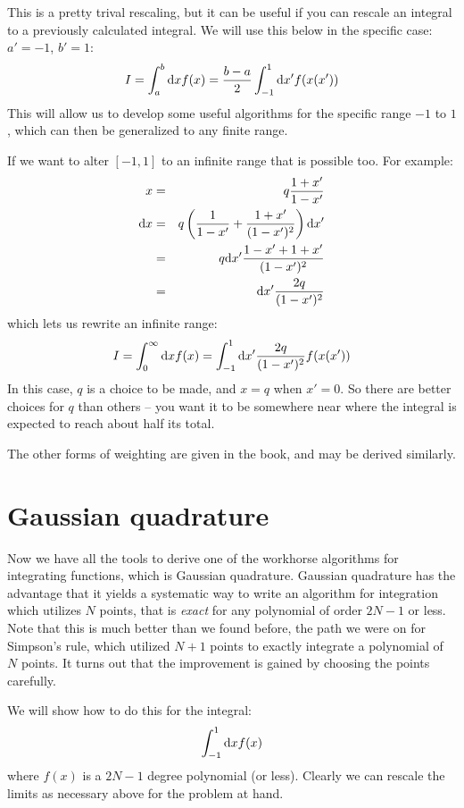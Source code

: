 This is a pretty trival rescaling, but it can be useful if you can
rescale an integral to a previously calculated integral. We will use
this below in the specific case: $a'=-1$, $b'=1$:
\begin{equation}
 I = \int_a^b {\rm d}x f(x) = \frac{b-a}{2} \int_{-1}^{1} {\rm d}x' f(x(x'))
\end{equation}
This will allow us to develop some useful algorithms for the specific
range $-1$ to $1$, which can then be generalized to any finite range.

If we want to alter $[-1, 1]$ to an infinite range that is possible
too.  For example:
\begin{eqnarray}
x &=& q \frac{1+x'}{1-x'}  \cr
{\rm d}x &=& q \left(\frac{1}{1-x'} + \frac{1+x'}{(1-x')^2}\right){\rm
d}x'\cr
&=& q {\rm d}x' \frac{1 -x' + 1 + x'}{(1-x')^2}  \cr
&=& {\rm d}x' \frac{2q}{(1-x')^2}  \cr
\end{eqnarray}
which lets us rewrite an infinite range:
\begin{equation}
 I = \int_0^\infty {\rm d}x f(x) = \int_{-1}^{1} {\rm d}x'
 \frac{2q}{(1-x')^2} f(x(x'))
\end{equation}
In this case, $q$ is a choice to be made, and $x=q$ when $x'=0$. So
there are better choices for $q$ than others -- you want it to be
somewhere near where the integral is expected to reach about half its
total.

The other forms of weighting are given in the book, and may be derived
similarly. 

\section{Gaussian quadrature}

Now we have all the tools to derive one of the workhorse algorithms
for integrating functions, which is Gaussian quadrature. Gaussian
quadrature has the advantage that it yields a systematic way to write
an algorithm for integration which utilizes $N$ points, that is {\it
  exact} for any polynomial of order $2N-1$ or less. Note that this is
much better than we found before, the path we were on for Simpson's
rule, which utilized $N+1$ points to exactly integrate a polynomial of
$N$ points. It turns out that the improvement is gained by choosing
the points carefully.

We will show how to do this for the integral:
\begin{equation}
\int_{-1}^{1} {\rm d}x f(x)
\end{equation}
where $f(x)$ is a $2N-1$ degree polynomial (or less).  Clearly we can
rescale the limits as necessary above for the problem at hand.

